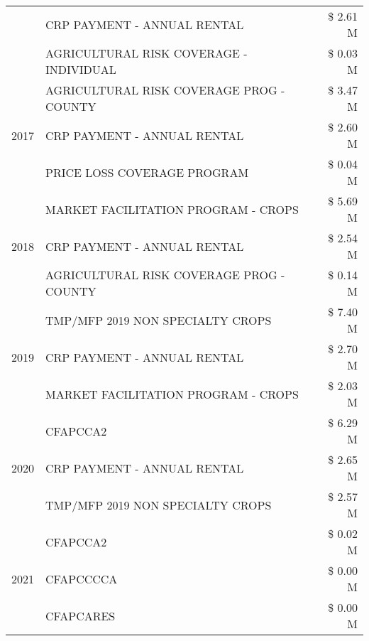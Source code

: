 \begin{tabular}{llr}
 & CRP PAYMENT - ANNUAL RENTAL                   & \$ 2.61 M \\
 & AGRICULTURAL RISK COVERAGE - INDIVIDUAL       & \$ 0.03 M \\
\cline{1-3}
\multirow[t]{3}{*}{2017} & AGRICULTURAL RISK COVERAGE PROG - COUNTY & \$ 3.47 M \\
 & CRP PAYMENT - ANNUAL RENTAL & \$ 2.60 M \\
 & PRICE LOSS COVERAGE PROGRAM & \$ 0.04 M \\
\cline{1-3}
\multirow[t]{3}{*}{2018} & MARKET FACILITATION PROGRAM - CROPS & \$ 5.69 M \\
 & CRP PAYMENT - ANNUAL RENTAL & \$ 2.54 M \\
 & AGRICULTURAL RISK COVERAGE PROG - COUNTY & \$ 0.14 M \\
\cline{1-3}
\multirow[t]{3}{*}{2019} & TMP/MFP 2019 NON SPECIALTY CROPS & \$ 7.40 M \\
 & CRP PAYMENT - ANNUAL RENTAL & \$ 2.70 M \\
 & MARKET FACILITATION PROGRAM - CROPS & \$ 2.03 M \\
\cline{1-3}
\multirow[t]{3}{*}{2020} & CFAPCCA2 & \$ 6.29 M \\
 & CRP PAYMENT - ANNUAL RENTAL & \$ 2.65 M \\
 & TMP/MFP 2019 NON SPECIALTY CROPS & \$ 2.57 M \\
\cline{1-3}
\multirow[t]{3}{*}{2021} & CFAPCCA2 & \$ 0.02 M \\
 & CFAPCCCCA & \$ 0.00 M \\
 & CFAPCARES & \$ 0.00 M \\
\cline{1-3}
\bottomrule
\end{tabular}
